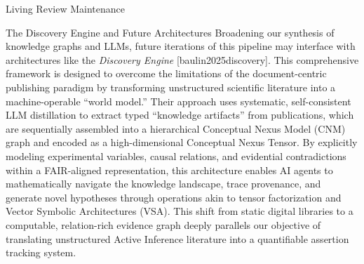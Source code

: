 \documentclass[
  ignorenonframetext,
]{beamer}
\providecommand{\citep}[1]{[#1]}
\begin{document}
\begin{frame}{Living Review Maintenance}
\begin{block}{The Discovery Engine and Future Architectures}
\protect{}\label{the-discovery-engine-and-future-architectures}
Broadening our synthesis of knowledge graphs and LLMs, future iterations
of this pipeline may interface with architectures like the
\emph{Discovery Engine} \citep{baulin2025discovery}. This comprehensive
framework is designed to overcome the limitations of the
document-centric publishing paradigm by transforming unstructured
scientific literature into a machine-operable ``world model.'' Their
approach uses systematic, self-consistent LLM distillation to extract
typed ``knowledge artifacts'' from publications, which are sequentially
assembled into a hierarchical Conceptual Nexus Model (CNM) graph and
encoded as a high-dimensional Conceptual Nexus Tensor. By explicitly
modeling experimental variables, causal relations, and evidential
contradictions within a FAIR-aligned representation, this architecture
enables AI agents to mathematically navigate the knowledge landscape,
trace provenance, and generate novel hypotheses through operations akin
to tensor factorization and Vector Symbolic Architectures (VSA). This
shift from static digital libraries to a computable, relation-rich
evidence graph deeply parallels our objective of translating
unstructured Active Inference literature into a quantifiable assertion
tracking system.
\end{block}
\end{frame}
\end{document}
